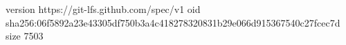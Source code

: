 version https://git-lfs.github.com/spec/v1
oid sha256:06f5892a23e43305df750b3a4c418278320831b29e066d915367540c27fcec7d
size 7503
